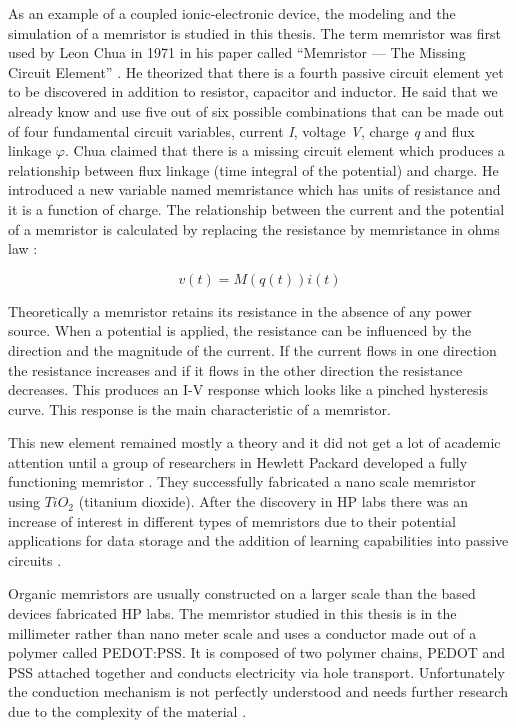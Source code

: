 \begin{doublespace}
As an example of a coupled ionic-electronic device, the modeling and the simulation of a memristor is studied in this thesis. The term memristor was first used by Leon Chua in 1971 in his paper called ``Memristor — The Missing Circuit Element'' \cite{chua}. He theorized that there is a fourth passive circuit element yet to be discovered in addition to resistor, capacitor and inductor. He said that we already know and use five out of six possible combinations that can be made out of four fundamental circuit variables, current \textit{I}, voltage \textit{V}, charge \textit{q} and flux linkage \textit{$\varphi$}. Chua claimed that there is a missing circuit element which produces a relationship between flux linkage (time integral of the potential) and charge. He introduced a new variable named memristance which has units of resistance and it is a function of charge. The relationship between the current and the potential of a memristor is calculated by replacing the resistance by memristance in ohms law \cite{memristance}:


\begin{equation}
v(t)=M(q(t))i(t)
\end{equation}

Theoretically a memristor retains its resistance in the absence of any power source. When a potential is applied, the resistance can be influenced by the direction and the magnitude of the current. If the current flows in one direction the resistance increases and if it flows in the other direction the resistance decreases. This produces an I-V response which looks like a pinched hysteresis curve. This response is the main characteristic of a memristor. 

This new element remained mostly a theory and it did not get a lot of academic attention until a group of researchers in Hewlett Packard developed a fully functioning memristor \cite{MisMem}. They successfully fabricated a nano scale memristor using $TiO_2$ (titanium dioxide). After the discovery in HP labs there was an increase of interest in different types of memristors due to their potential applications for data storage and the addition of learning capabilities into passive circuits \cite{AdaptiveMem} \cite{Synapse} \cite{CMOS}. 

Organic memristors are usually constructed on a larger scale than the  based devices fabricated  HP labs. The memristor studied in this thesis is in the millimeter rather than nano meter scale and uses a conductor made out of a polymer called PEDOT:PSS. It is composed of two polymer chains, PEDOT and PSS attached together and conducts electricity via hole transport. Unfortunately the conduction mechanism is not perfectly understood and needs further research due to the complexity of the material \cite{PedotBook}.


\end{doublespace}
